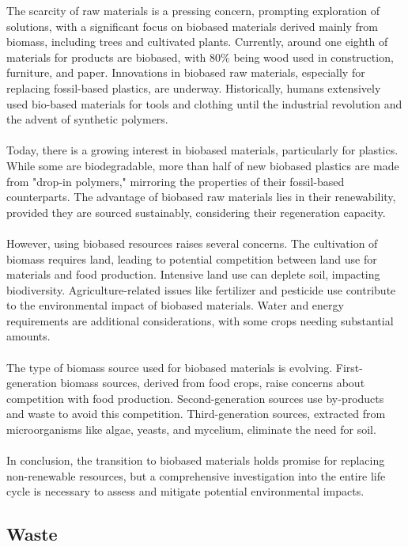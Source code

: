 \documentclass[../summary.tex]{subfiles}
\begin{document}
The scarcity of raw materials is a pressing concern, prompting exploration of solutions, with a significant focus on biobased materials derived mainly from biomass, including trees and cultivated plants. Currently, around one eighth of materials for products are biobased, with 80\% being wood used in construction, furniture, and paper. Innovations in biobased raw materials, especially for replacing fossil-based plastics, are underway. Historically, humans extensively used bio-based materials for tools and clothing until the industrial revolution and the advent of synthetic polymers.\\
\\
Today, there is a growing interest in biobased materials, particularly for plastics. While some are biodegradable, more than half of new biobased plastics are made from "drop-in polymers," mirroring the properties of their fossil-based counterparts. The advantage of biobased raw materials lies in their renewability, provided they are sourced sustainably, considering their regeneration capacity.\\
\\
However, using biobased resources raises several concerns. The cultivation of biomass requires land, leading to potential competition between land use for materials and food production. Intensive land use can deplete soil, impacting biodiversity. Agriculture-related issues like fertilizer and pesticide use contribute to the environmental impact of biobased materials. Water and energy requirements are additional considerations, with some crops needing substantial amounts.\\
\\
The type of biomass source used for biobased materials is evolving. First-generation biomass sources, derived from food crops, raise concerns about competition with food production. Second-generation sources use by-products and waste to avoid this competition. Third-generation sources, extracted from microorganisms like algae, yeasts, and mycelium, eliminate the need for soil.\\
\\
In conclusion, the transition to biobased materials holds promise for replacing non-renewable resources, but a comprehensive investigation into the entire life cycle is necessary to assess and mitigate potential environmental impacts.

\subsection{Waste}
\end{document}
